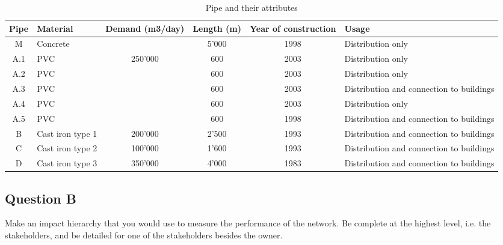 \begin{table}
\caption{Pipe and their attributes}
\begin{tabular}{|l|l|l|l|l|p{80pt}|}
\hline
\multicolumn{1}{|c|}{Pipe} & Material & \multicolumn{1}{c|}{Demand (m3/day)} & \multicolumn{1}{c|}{Length (m)} & \multicolumn{1}{c|}{Year of construction} & Usage \\ 
\hline
\multicolumn{1}{|c|}{M} & Concrete & \multicolumn{1}{c|}{} & \multicolumn{1}{c|}{5'000} & \multicolumn{1}{c|}{1998} & Distribution only \\ 
\hline
\multicolumn{1}{|c|}{A.1} & PVC & \multicolumn{1}{c|}{250'000} & \multicolumn{1}{c|}{600} & \multicolumn{1}{c|}{2003} & Distribution only \\ 
\cline{1-2}\cline{4-6}
\multicolumn{1}{|c|}{A.2} & PVC & \multicolumn{1}{c|}{} & \multicolumn{1}{c|}{600} & \multicolumn{1}{c|}{2003} & Distribution only \\ 
\cline{1-2}\cline{4-6}
\multicolumn{1}{|c|}{A.3} & PVC & \multicolumn{1}{c|}{} & \multicolumn{1}{c|}{600} & \multicolumn{1}{c|}{2003} & Distribution and connection to buildings \\ 
\cline{1-2}\cline{4-6}
\multicolumn{1}{|c|}{A.4} & PVC & \multicolumn{1}{c|}{} & \multicolumn{1}{c|}{600} & \multicolumn{1}{c|}{2003} & Distribution only \\ 
\cline{1-2}\cline{4-6}
\multicolumn{1}{|c|}{A.5} & PVC & \multicolumn{1}{c|}{} & \multicolumn{1}{c|}{600} & \multicolumn{1}{c|}{1998} & Distribution and connection to buildings \\ 
\hline
\multicolumn{1}{|c|}{B} & Cast iron type 1 & \multicolumn{1}{c|}{200'000} & \multicolumn{1}{c|}{2'500} & \multicolumn{1}{c|}{1993} & Distribution and connection to buildings \\ 
\hline
\multicolumn{1}{|c|}{C} & Cast iron type 2 & \multicolumn{1}{c|}{100'000} & \multicolumn{1}{c|}{1'600} & \multicolumn{1}{c|}{1993} & Distribution and connection to buildings \\ 
\hline
\multicolumn{1}{|c|}{D} & Cast iron type 3 & \multicolumn{1}{c|}{350'000} & \multicolumn{1}{c|}{4'000} & \multicolumn{1}{c|}{1983} & Distribution and connection to buildings \\ 
\hline
\end{tabular}
\label{tbl:213}
\end{table}
%
\subsection{Question B}
Make an impact hierarchy that you would use to measure the performance of the network. Be complete at the highest level, i.e. the stakeholders, and be detailed for one of the stakeholders besides the owner.

